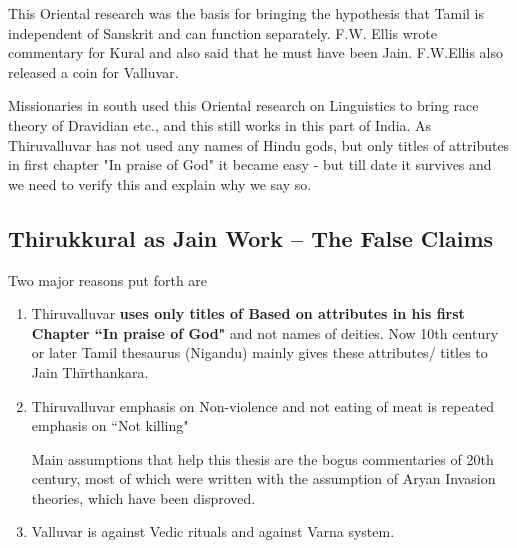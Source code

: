 This Oriental research was the basis for bringing the hypothesis that Tamil is independent of Sanskrit and can function separately. F.W. Ellis wrote commentary for Kural and also said that he must have been Jain. F.W.Ellis also released a coin for Valluvar.

Missionaries in south used this Oriental research on Linguistics to bring race theory of Dravidian etc., and this still works in this part of India. As Thiruvalluvar has not used any names of Hindu gods, but only titles of attributes in first chapter "In praise of God" it became easy - but till date it survives and we need to verify this and explain why we say so.

\subsection*{Thirukkural as Jain Work – The False Claims}

Two major reasons put forth are

\begin{enumerate}[{\rm 1)}]
\itemsep=0pt
\item Thiruvalluvar \textbf{uses only titles of Based on attributes in his first Chapter “In praise of God"} and not names of deities. Now 10th century or later Tamil thesaurus (Nigandu) mainly gives these attributes/ titles to Jain Thīrthankara.

 \item 
 Thiruvalluvar emphasis on Non-violence and not eating of meat is repeated emphasis on “Not killing"

 Main assumptions that help this thesis are the bogus commentaries of 20th century, most of which were written with the assumption of Aryan Invasion theories, which have been disproved.

 \item Valluvar is against Vedic rituals and against Varna system.

\end{enumerate}


